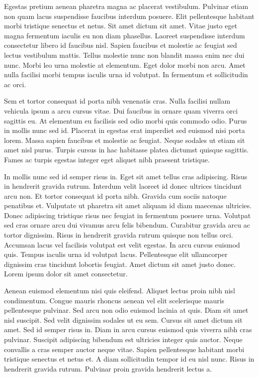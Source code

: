 \documentclass[11pt,a4paper]{article}
\begin{document}
Egestas pretium aenean pharetra magna ac placerat vestibulum. Pulvinar etiam non quam lacus suspendisse faucibus interdum posuere. Elit pellentesque habitant morbi tristique senectus et netus. Sit amet dictum sit amet. Vitae justo eget magna fermentum iaculis eu non diam phasellus. Laoreet suspendisse interdum consectetur libero id faucibus nisl. Sapien faucibus et molestie ac feugiat sed lectus vestibulum mattis. Tellus molestie nunc non blandit massa enim nec dui nunc. Morbi leo urna molestie at elementum. Eget dolor morbi non arcu. Amet nulla facilisi morbi tempus iaculis urna id volutpat. In fermentum et sollicitudin ac orci.

Sem et tortor consequat id porta nibh venenatis cras. Nulla facilisi nullam vehicula ipsum a arcu cursus vitae. Dui faucibus in ornare quam viverra orci sagittis eu. At elementum eu facilisis sed odio morbi quis commodo odio. Purus in mollis nunc sed id. Placerat in egestas erat imperdiet sed euismod nisi porta lorem. Massa sapien faucibus et molestie ac feugiat. Neque sodales ut etiam sit amet nisl purus. Turpis cursus in hac habitasse platea dictumst quisque sagittis. Fames ac turpis egestas integer eget aliquet nibh praesent tristique.

In mollis nunc sed id semper risus in. Eget sit amet tellus cras adipiscing. Risus in hendrerit gravida rutrum. Interdum velit laoreet id donec ultrices tincidunt arcu non. Et tortor consequat id porta nibh. Gravida cum sociis natoque penatibus et. Vulputate ut pharetra sit amet aliquam id diam maecenas ultricies. Donec adipiscing tristique risus nec feugiat in fermentum posuere urna. Volutpat sed cras ornare arcu dui vivamus arcu felis bibendum. Curabitur gravida arcu ac tortor dignissim. Risus in hendrerit gravida rutrum quisque non tellus orci. Accumsan lacus vel facilisis volutpat est velit egestas. In arcu cursus euismod quis. Tempus iaculis urna id volutpat lacus. Pellentesque elit ullamcorper dignissim cras tincidunt lobortis feugiat. Amet dictum sit amet justo donec. Lorem ipsum dolor sit amet consectetur.

Aenean euismod elementum nisi quis eleifend. Aliquet lectus proin nibh nisl condimentum. Congue mauris rhoncus aenean vel elit scelerisque mauris pellentesque pulvinar. Sed arcu non odio euismod lacinia at quis. Diam sit amet nisl suscipit. Sed velit dignissim sodales ut eu sem. Cursus sit amet dictum sit amet. Sed id semper risus in. Diam in arcu cursus euismod quis viverra nibh cras pulvinar. Suscipit adipiscing bibendum est ultricies integer quis auctor. Neque convallis a cras semper auctor neque vitae. Sapien pellentesque habitant morbi tristique senectus et netus et. A diam sollicitudin tempor id eu nisl nunc. Risus in hendrerit gravida rutrum. Pulvinar proin gravida hendrerit lectus a.
\end{document}
